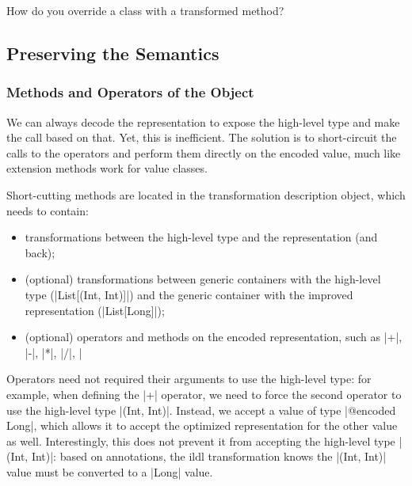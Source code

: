 How do you override a class with a transformed method?

\subsection{Preserving the Semantics}
\label{sec:ildl:semantics}

\subsubsection{Methods and Operators of the Object}
We can always decode the representation to expose the high-level type and make the call based on that. Yet, this is inefficient. The solution is to short-circuit the calls to the operators and perform them directly on the encoded value, much like extension methods work for value classes.

Short-cutting methods are located in the transformation description object, which needs to contain:
\begin{itemize}
  \item transformations between the high-level type and the representation (and back);
  \item (optional) transformations between generic containers with the high-level type (|List[(Int, Int)]|) and the generic container with the improved representation (|List[Long]|);
  \item (optional) operators and methods on the encoded representation, such as |+|, |-|, |*|, |/|, |%
\end{itemize}

Operators need not required their arguments to use the high-level type: for example, when defining the |+| operator, we need to force the second operator to use the high-level type |(Int, Int)|. Instead, we accept a value of type |@encoded Long|, which allows it to accept the optimized representation for the other value as well. Interestingly, this does not prevent it from accepting the high-level type |(Int, Int)|: based on annotations, the ildl transformation knows the |(Int, Int)| value must be converted to a |Long| value.

